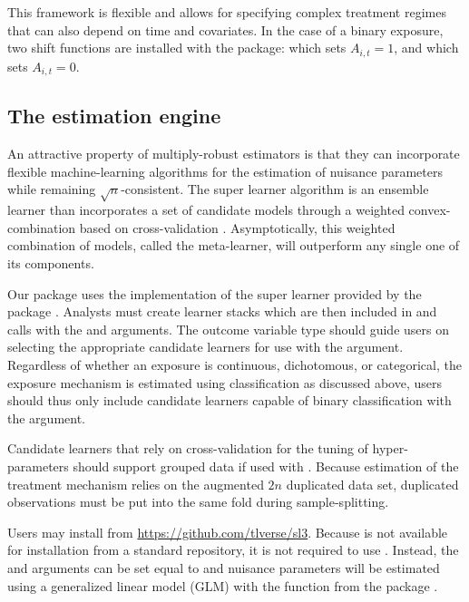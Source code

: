 \documentclass[]{jss}
\begin{document}
This framework is flexible and allows for specifying complex treatment
regimes that can also depend on time and covariates. In the case of a
binary exposure, two shift functions are installed with
the package:  which sets \(A_{i, t} = 1\), and
 which sets \(A_{i, t} = 0\).

\hypertarget{the-estimation-engine}{%
\subsection{The estimation engine}\label{the-estimation-engine}}

An attractive property of multiply-robust estimators is that they can
incorporate flexible machine-learning algorithms for the estimation of
nuisance parameters while remaining \(\sqrt{n}\)-consistent. The super
learner algorithm is an ensemble learner than incorporates a set of
candidate models through a weighted convex-combination based on
cross-validation \citep{laanSuperLearner2007}. Asymptotically, this
weighted combination of models, called the meta-learner, will outperform
any single one of its components.

Our package uses the implementation of the super learner provided by
the  package \citep{coyleSl3}. Analysts must create 
learner stacks which are then included in  and
 calls with the  and
 arguments. The outcome variable type should guide
users on selecting the appropriate candidate learners for use with the
 argument. Regardless of whether an exposure is
continuous, dichotomous, or categorical, the exposure mechanism is
estimated using classification as discussed above, users should thus
only include candidate learners capable of binary classification with
the  argument.

Candidate learners that rely on cross-validation
for the tuning of hyper-parameters should support grouped data if used with . Because
estimation of the treatment mechanism relies on the augmented \(2n\) duplicated
data set, duplicated observations must be put into the same fold during sample-splitting. 

Users may install  from \url{https://github.com/tlverse/sl3}.
Because  is not available for installation from a standard
repository, it is not required to use . Instead, the
 and  arguments can be set equal
to  and nuisance parameters will be estimated using a
generalized linear model (GLM) with the  function from the
 package \citep{rcore}.
\end{document}
